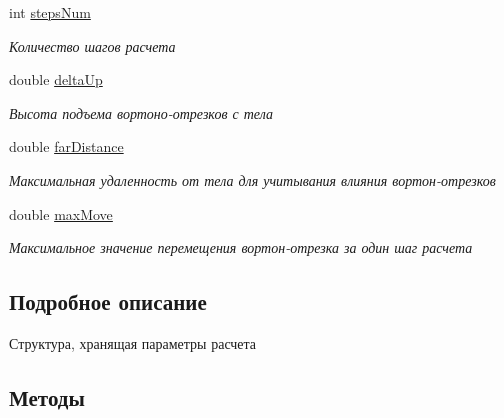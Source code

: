 \begin{DoxyCompactItemize}
int \mbox{\hyperlink{struct_solver_parameters_ae7ed64ac6fb80155e47866f497196283}{steps\+Num}}
\begin{DoxyCompactList}\small\item\em Количество шагов расчета \end{DoxyCompactList}\item 
\mbox{\label{struct_solver_parameters_a44c2fdee141ce563fc5fee41c33dcf29}} 
double \mbox{\hyperlink{struct_solver_parameters_a44c2fdee141ce563fc5fee41c33dcf29}{delta\+Up}}
\begin{DoxyCompactList}\small\item\em Высота подъема вортоно-\/отрезков с тела \end{DoxyCompactList}\item 
\mbox{\label{struct_solver_parameters_a17ef12650ff6026b9425fba440d9504f}} 
double \mbox{\hyperlink{struct_solver_parameters_a17ef12650ff6026b9425fba440d9504f}{far\+Distance}}
\begin{DoxyCompactList}\small\item\em Максимальная удаленность от тела для учитывания влияния вортон-\/отрезков \end{DoxyCompactList}\item 
\mbox{\label{struct_solver_parameters_a02663c0c55301bda6db7d622d4d7a9c6}} 
double \mbox{\hyperlink{struct_solver_parameters_a02663c0c55301bda6db7d622d4d7a9c6}{max\+Move}}
\begin{DoxyCompactList}\small\item\em Максимальное значение перемещения вортон-\/отрезка за один шаг расчета \end{DoxyCompactList}\end{DoxyCompactItemize}


\subsection{Подробное описание}
Структура, хранящая параметры расчета 

\subsection{Методы}
\mbox{\label{struct_solver_parameters_a431f8f2054ae8676047e49a008aeb97d}} 
